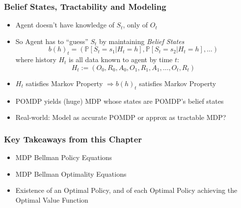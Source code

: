 \documentclass[handout]{beamer}
\begin{document}
\begin{frame}
\frametitle{Belief States, Tractability and Modeling}
\pause
\begin{itemize}[<+->]
\item Agent doesn't have knowledge of $S_t$, only of $O_t$
\item So Agent has to ``guess'' $S_t$ by maintaining {\em Belief States}
$$b(h)_t = (\mathbb{P}[S_t=s_1 | H_t = h], \mathbb{P}[S_t = s_2 | H_t = h], \ldots )$$
where history $H_t$ is all data known to agent by time $t$:
$$H_t := (O_0, R_0, A_0, O_1, R_1, A_1, \ldots, O_t, R_t)$$
\item $H_t$ satisfies Markov Property $\Rightarrow  b(h)_t$ satisfies Markov Property
\item POMDP yields (huge) MDP whose states are POMDP's belief states
\item Real-world: Model as accurate POMDP or approx as tractable MDP?
\end{itemize}
\end{frame}

\begin{frame}
\frametitle{Key Takeaways from this Chapter}
\pause
\begin{itemize}[<+->]
\item MDP Bellman Policy Equations
\item MDP Bellman Optimality Equations
\item Existence of an Optimal Policy, and of each Optimal Policy achieving the Optimal Value Function
\end{itemize}
\end{frame}
\end{document}
